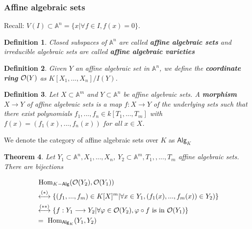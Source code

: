 \documentclass[11pt]{article}
\newtheorem{thm}{Theorem}[section]
\newtheorem{dfn}[thm]{Definition}
\renewcommand{\hom}{\text{ Hom}}
\newcommand{\affn}{\mathbb A}
\newcommand{\calo}{{\cal O}}
\newcommand{\lrta}{\longrightarrow}
\newcommand{\llrta}{\longleftrightarrow}
\begin{document}
\subsubsection{Affine algebraic sets}
Recall: $V(I)\subset \affn^n =\{x|\forall f\in I, f(x)=0\}$.
\begin{dfn}
Closed subspaces of $\affn^n$ are called \textbf{affine algebraic sets} and irreducible algebraic sets are called \textbf{affine algebraic varieties}
\end{dfn}
\begin{dfn}
Given $Y$ an affine algebraic set in $\affn^n$, we define the \textbf{coordinate ring} $\calo(Y)$ as $K[X_1,...,X_n]/I(Y)$.
\end{dfn}
\begin{dfn}
Let $X\subset \affn^m$ and $Y \subset \affn^n$ be affine algebraic sets. A \textbf{morphism} $X \lrta Y$ of affine algebraic sets is a map $f : X \lrta Y$ of the underlying sets such that there exist polynomials $f_1,...,f_n \in k[T_1,...,T_m]$ with $f(x) = (f_1(x),...,f_n(x))$ for all $x\in X$. 
\end{dfn}
We denote the category of affine algebraic sets over $K$ as $\mathsf{Alg}_K$
\begin{thm}\label{thm:equivalence_of_categories_algebraic_sets_K_algebras}
Let $Y_1\subset \affn^n, X_1,...,X_n$, $Y_2\subset \affn^m, T_1,,..., T_m$ affine algebraic sets. There are bijections 

$$
\begin{aligned}
&\hom_{K\mathsf{-Alg}}(\calo(Y_2),\calo(Y_1))
\\
&\overset{(*)}{\llrta}\{(f_1,...,f_m)\in K[X]^m|\forall x\in Y_1,(f_1(x),...,f_m(x))\in Y_2) \}\\
&\overset{(**)}{\llrta} \{f:Y_1\lrta Y_2|\forall \varphi\in \calo(Y_2),\varphi\circ f\text{ is  in }  \calo(Y_1)\}\\
&=\hom_{\mathsf{Alg}_K}(Y_1,Y_2)
\end{aligned}
$$
\end{thm}
\end{document}
